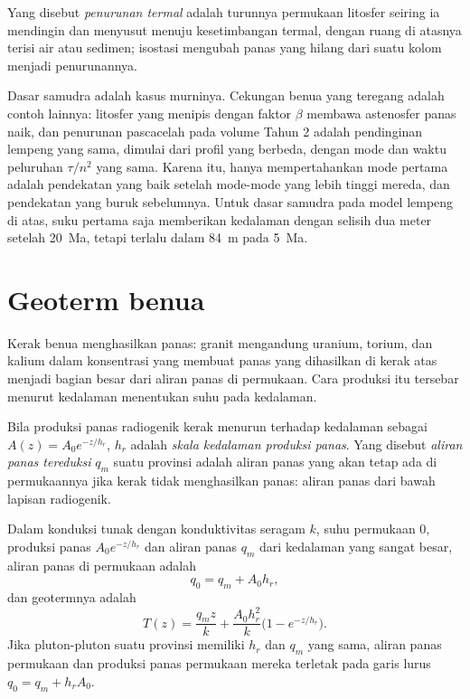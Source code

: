\begin{definition}\label{def:b3:lithosphere-thermal-models:thermal-subsidence}
Yang disebut \emph{penurunan termal} adalah turunnya
permukaan litosfer seiring ia mendingin dan menyusut menuju
kesetimbangan termal, dengan ruang di atasnya terisi air atau sedimen; isostasi
mengubah panas yang hilang dari suatu kolom menjadi penurunannya.
\end{definition}

Dasar samudra adalah kasus murninya. Cekungan benua yang teregang adalah contoh
lainnya: litosfer yang menipis dengan faktor $\beta$ membawa astenosfer panas naik, dan
penurunan pascacelah pada volume Tahun 2 adalah pendinginan lempeng yang sama, dimulai
dari profil yang berbeda, dengan mode dan waktu peluruhan $\tau/n^2$ yang sama.
Karena itu, hanya mempertahankan mode pertama adalah pendekatan yang baik setelah mode-mode
yang lebih tinggi mereda, dan pendekatan yang buruk sebelumnya. Untuk dasar samudra pada model lempeng
di atas, suku pertama saja memberikan kedalaman dengan selisih dua meter setelah
\qty{20}{Ma}, tetapi terlalu dalam \qty{84}{m} pada \qty{5}{Ma}.

\section{Geoterm benua}

Kerak benua menghasilkan panas: granit mengandung uranium, torium, dan kalium dalam
konsentrasi yang membuat panas yang dihasilkan di kerak atas menjadi bagian besar dari
aliran panas di permukaan. Cara produksi itu tersebar menurut kedalaman
menentukan suhu pada kedalaman.

\begin{definition}\label{def:b3:lithosphere-thermal-models:reduced}
Bila produksi panas radiogenik kerak menurun terhadap kedalaman sebagai
$A(z) = A_0e^{-z/h_r}$, $h_r$ adalah \emph{skala kedalaman
produksi panas}. Yang disebut \emph{aliran panas
tereduksi} $q_m$ suatu provinsi adalah aliran panas yang akan
tetap ada di permukaannya jika kerak tidak menghasilkan panas: aliran panas dari bawah
lapisan radiogenik.
\end{definition}

\begin{proposition}\label{prop:b3:lithosphere-thermal-models:exponential}
Dalam konduksi tunak dengan konduktivitas seragam $k$, suhu permukaan $0$,
produksi panas $A_0e^{-z/h_r}$ dan aliran panas $q_m$ dari kedalaman yang sangat besar,
aliran panas di permukaan adalah
\[
  q_0 = q_m + A_0h_r,
\]
dan geotermnya adalah
\[
  T(z) = \frac{q_mz}{k} + \frac{A_0h_r^2}{k}\bigl(1 - e^{-z/h_r}\bigr).
\]
Jika pluton-pluton suatu provinsi memiliki $h_r$ dan $q_m$ yang sama, aliran panas
permukaan dan produksi panas permukaan mereka terletak pada garis lurus
$q_0 = q_m + h_rA_0$.
\end{proposition}

